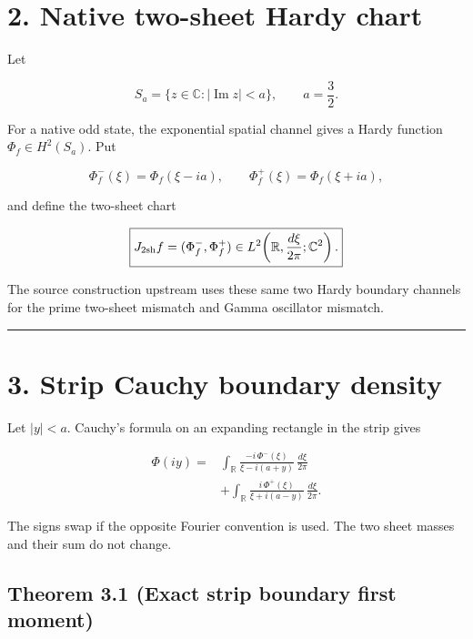 \hypertarget{native-two-sheet-hardy-chart}{%
\section{2. Native two-sheet Hardy chart}\label{native-two-sheet-hardy-chart}}

Let

\[
S_a=\{z\in\mathbb C:|\operatorname{Im}z|<a\},
\qquad a=\frac32.
\]

For a native odd state, the exponential spatial channel gives a Hardy function
\(\Phi_f\in H^2(S_a)\). Put

\[
\Phi_f^-(\xi)=\Phi_f(\xi-ia),
\qquad
\Phi_f^+(\xi)=\Phi_f(\xi+ia),
\]

and define the two-sheet chart

\[
\boxed{
J_{\rm 2sh}f=(\Phi_f^-,\Phi_f^+)
\in
L^2\!\left(\mathbb R,\frac{d\xi}{2\pi};\mathbb C^2\right).
}
\]

The source construction upstream uses these same two Hardy boundary channels
for the prime two-sheet mismatch and Gamma oscillator mismatch.

\begin{center}\rule{0.5\linewidth}{0.5pt}\end{center}

\hypertarget{strip-cauchy-boundary-density}{%
\section{3. Strip Cauchy boundary density}\label{strip-cauchy-boundary-density}}

Let \(|y|<a\). Cauchy's formula on an expanding rectangle in the strip gives

\[
\boxed{
\begin{aligned}
\Phi(iy)
={}&
\int_{\mathbb R}
\frac{-i\,\Phi^-(\xi)}{\xi-i(a+y)}\,\frac{d\xi}{2\pi}
\\
&+
\int_{\mathbb R}
\frac{i\,\Phi^+(\xi)}{\xi+i(a-y)}\,\frac{d\xi}{2\pi}.
\end{aligned}
}
\tag{3.1}
\]

The signs swap if the opposite Fourier convention is used. The two sheet
masses and their sum do not change.

\hypertarget{theorem-3.1-exact-strip-boundary-first-moment}{%
\subsection{Theorem 3.1 (Exact strip boundary first moment)}\label{theorem-3.1-exact-strip-boundary-first-moment}}

